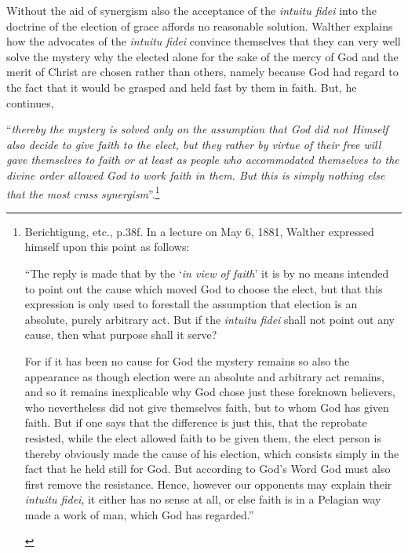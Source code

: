                 Without the aid of synergism also the acceptance of the \textit{intuitu fidei} into the doctrine of the election of grace affords no reasonable solution.  Walther explains how the advocates of the \textit{intuitu fidei} convince themselves that they can very well solve the mystery why the elected alone for the sake of the mercy of God and the merit of Christ are chosen rather than others, namely because God had regard to the fact that it would be grasped and held fast by them in faith.  But, he continues, \begin{displayquote} ``\textit{thereby the mystery is solved only on the assumption that God did not Himself also decide to give faith to the elect, but they rather by virtue of their free will gave themselves to faith or at least as people who accommodated themselves to the divine order allowed God to work faith in them.  But this is simply nothing else that the most crass synergism}”.\footnote{Berichtigung, etc., p.38f.  In a lecture on May 6, 1881, Walther expressed himself upon this point as follows: \begin{displayquote}“The reply is made that by the ‘\textit{in view of faith}’ it is by no means intended to point out the cause which moved God to choose the elect, but that this expression is only used to forestall the assumption that election is an absolute, purely arbitrary act.  But if the \textit{intuitu fidei} shall not point out any cause, then what purpose shall it serve? \par For if it has been no cause for God the mystery remains so also the appearance as though election were an absolute and arbitrary act remains, and so it remains inexplicable why God chose just these foreknown believers, who nevertheless did not give themselves faith, but to whom God has given faith.  But if one says that the difference is just this, that the reprobate resisted, while the elect allowed faith to be given them, the elect person is thereby obviously made the cause of his election, which consists simply in the fact that he held still for God.  But according to God’s Word God must also first remove the resistance.  Hence, however our opponents may explain their \textit{intuitu fidei}, it either has no sense at all, or else faith is in a Pelagian way made a work of man, which God has regarded.''
\end{displayquote}} \end{displayquote}
 

